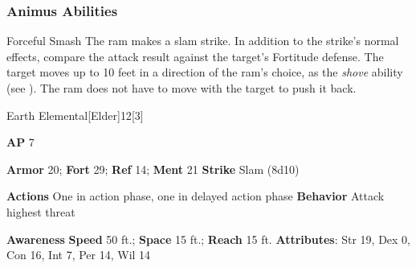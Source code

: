 \subsubsection{Animus Abilities}

\begin{freeability}{Forceful Smash}
The ram makes a slam strike.
In addition to the strike's normal effects, compare the attack result against the target's Fortitude defense.
\hit The target moves up to 10 feet in a direction of the ram's choice, as the \textit{shove} ability (see ).
The ram does not have to move with the target to push it back.
\end{freeability}

\begin{monsection}{Earth Elemental}[Elder]{12}[3]
\vspace{-1em}\vspace{-1em}
\begin{spellcontent}
\begin{spelltargetinginfo}
{\textbf{AP} 7}

\pari \textbf{Armor} 20;
\textbf{Fort} 29;
\textbf{Ref} 14;
\textbf{Ment} 21
\pari \textbf{Strike} Slam  (8d10)


\pari \textbf{Actions} One in action phase, one in delayed action phase
\pari \textbf{Behavior} Attack highest threat
\end{spelltargetinginfo}
\end{spellcontent}

\begin{monsterfooter}
\pari \textbf{Awareness} 
\pari \textbf{Speed} 50 ft.;
\textbf{Space} 15 ft.;
\textbf{Reach} 15 ft.
\pari \textbf{Attributes}:
Str 19,
Dex 0,
Con 16,
Int 7,
Per 14,
Wil 14
\end{monsterfooter}
\end{monsection}

